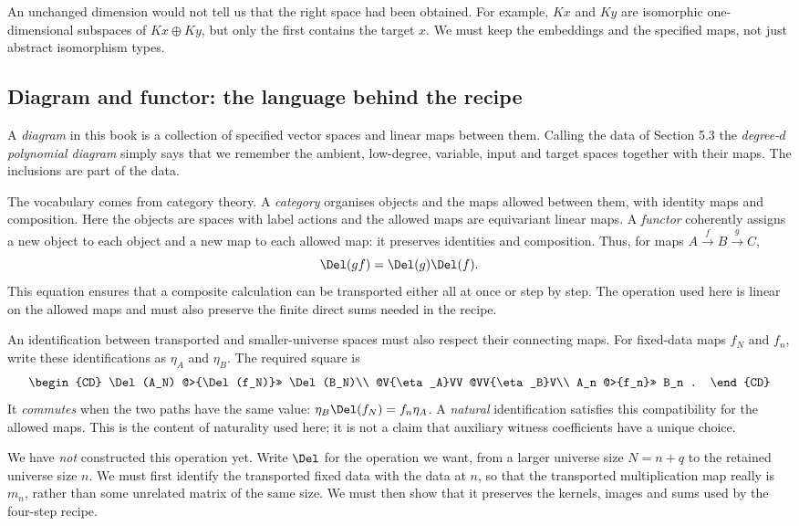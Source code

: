 An unchanged dimension would not tell us that the right space had
been obtained. For example, $Kx$ and $Ky$ are isomorphic
one-dimensional subspaces of $Kx\oplus Ky$, but only the first
contains the target $x$. We must keep the embeddings and the
specified maps, not just abstract isomorphism types.

\subsection{Diagram and functor: the language behind the recipe}
A \emph{diagram} in this book is a collection of specified vector
spaces and linear maps between them. Calling the data of Section 5.3
the \emph{degree-$d$ polynomial diagram} simply says that we remember
the ambient, low-degree, variable, input and target spaces together
with their maps. The inclusions are part of the data.

The vocabulary comes from category theory. A \emph{category} organises
objects and the maps allowed between them, with identity maps and
composition. Here the objects are spaces with label actions and the
allowed maps are equivariant linear maps. A \emph{functor} coherently
assigns a new object to each object and a new map to each allowed
map: it preserves identities and composition. Thus, for maps
$A\xrightarrow{f}B\xrightarrow{g}C$,
\[
                \Del(gf)=\Del(g)\Del(f).
\]
This equation ensures that a composite calculation can be
transported either all at once or step by step.
The operation used here is linear on the allowed maps and must
also preserve the finite direct sums needed in the recipe.

An identification between transported and smaller-universe spaces must
also respect their connecting maps. For fixed-data maps $f_N$ and
$f_n$, write these identifications as $\eta_A$ and $\eta_B$. The
required square is
\[
\begin{CD}
\Del(A_N) @>{\Del(f_N)}>> \Del(B_N)\\
@V{\eta_A}VV @VV{\eta_B}V\\
A_n @>{f_n}>> B_n .
\end{CD}
\]
It \emph{commutes} when the two paths have the same value:
$\eta_B\Del(f_N)=f_n\eta_A$. A \emph{natural} identification satisfies
this compatibility for the allowed maps. This is the content of
naturality used here; it is not a claim that auxiliary witness
coefficients have a unique choice.

We have \emph{not} constructed this operation yet.
Write $\Del$ for the operation we want, from a larger universe size
$N=n+q$ to the retained universe size $n$. We must first identify the transported
fixed data with the data at $n$, so that the transported multiplication
map really is $m_n$, rather than some unrelated matrix of the same size.
We must then show that it preserves the kernels, images and sums
used by the four-step recipe.

